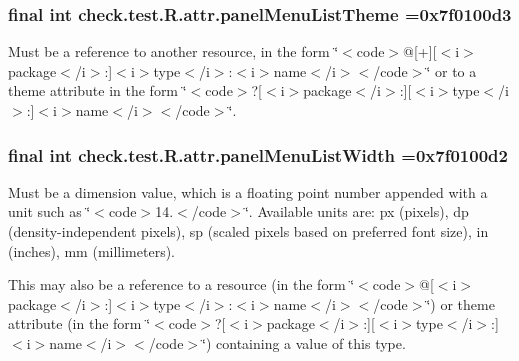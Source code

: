 \subsubsection[{panel\+Menu\+List\+Theme}]{\setlength{\rightskip}{0pt plus 5cm}final int check.\+test.\+R.\+attr.\+panel\+Menu\+List\+Theme =0x7f0100d3\hspace{0.3cm}{\ttfamily [static]}}\label{classcheck_1_1test_1_1_r_1_1attr_a6f31f89058cb2734f29f1bb7913c05db}
Must be a reference to another resource, in the form \char`\"{}$<$code$>$@\mbox{[}+\mbox{]}\mbox{[}$<$i$>$package$<$/i$>$\+:\mbox{]}$<$i$>$type$<$/i$>$\+:$<$i$>$name$<$/i$>$$<$/code$>$\char`\"{} or to a theme attribute in the form \char`\"{}$<$code$>$?\mbox{[}$<$i$>$package$<$/i$>$\+:\mbox{]}\mbox{[}$<$i$>$type$<$/i$>$\+:\mbox{]}$<$i$>$name$<$/i$>$$<$/code$>$\char`\"{}. \hypertarget{classcheck_1_1test_1_1_r_1_1attr_af36f49eda2d47bd95cb2012376a0547d}{}
\subsubsection[{panel\+Menu\+List\+Width}]{\setlength{\rightskip}{0pt plus 5cm}final int check.\+test.\+R.\+attr.\+panel\+Menu\+List\+Width =0x7f0100d2\hspace{0.3cm}{\ttfamily [static]}}\label{classcheck_1_1test_1_1_r_1_1attr_af36f49eda2d47bd95cb2012376a0547d}
Must be a dimension value, which is a floating point number appended with a unit such as \char`\"{}$<$code$>$14.\+5sp$<$/code$>$\char`\"{}. Available units are\+: px (pixels), dp (density-\/independent pixels), sp (scaled pixels based on preferred font size), in (inches), mm (millimeters). 

This may also be a reference to a resource (in the form \char`\"{}$<$code$>$@\mbox{[}$<$i$>$package$<$/i$>$\+:\mbox{]}$<$i$>$type$<$/i$>$\+:$<$i$>$name$<$/i$>$$<$/code$>$\char`\"{}) or theme attribute (in the form \char`\"{}$<$code$>$?\mbox{[}$<$i$>$package$<$/i$>$\+:\mbox{]}\mbox{[}$<$i$>$type$<$/i$>$\+:\mbox{]}$<$i$>$name$<$/i$>$$<$/code$>$\char`\"{}) containing a value of this type. \hypertarget{classcheck_1_1test_1_1_r_1_1attr_aba44c089874abc974a6e8827efcd53ea}{}
